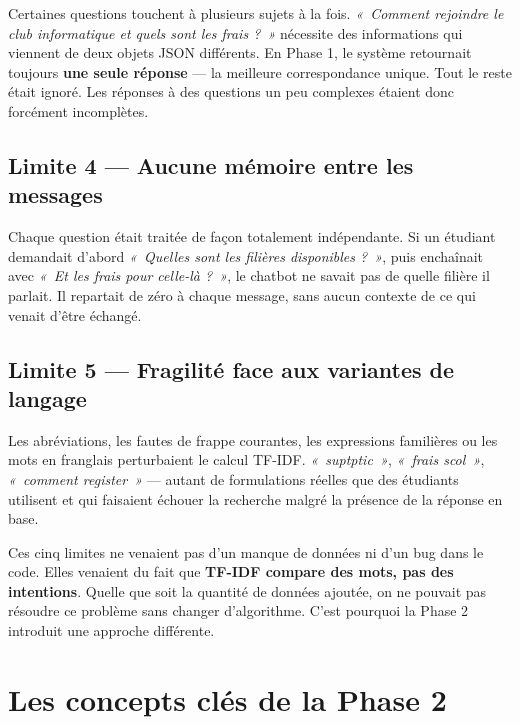 \documentclass[11pt,a4paper]{article}
\begin{document}
Certaines questions touchent à plusieurs sujets à la fois.
\textit{«~Comment rejoindre le club informatique et quels sont
les frais ?~»} nécessite des informations qui viennent de deux
objets JSON différents. En Phase 1, le système retournait
toujours \textbf{une seule réponse} --- la meilleure correspondance
unique. Tout le reste était ignoré. Les réponses à des questions
un peu complexes étaient donc forcément incomplètes.

\subsection{Limite 4 --- Aucune mémoire entre les messages}

Chaque question était traitée de façon totalement indépendante.
Si un étudiant demandait d'abord \textit{«~Quelles sont les filières
disponibles ?~»}, puis enchaînait avec \textit{«~Et les frais pour
celle-là ?~»}, le chatbot ne savait pas de quelle filière il
parlait. Il repartait de zéro à chaque message, sans aucun
contexte de ce qui venait d'être échangé.

\subsection{Limite 5 --- Fragilité face aux variantes de langage}

Les abréviations, les fautes de frappe courantes, les expressions
familières ou les mots en franglais perturbaient le calcul TF-IDF.
\textit{«~suptptic~»}, \textit{«~frais scol~»}, \textit{«~comment
register~»} --- autant de formulations réelles que des étudiants
utilisent et qui faisaient échouer la recherche malgré la
présence de la réponse en base.

\vspace{0.5cm}

\begin{important}
Ces cinq limites ne venaient pas d'un manque de données
ni d'un bug dans le code. Elles venaient du fait que
\textbf{TF-IDF compare des mots, pas des intentions}.
Quelle que soit la quantité de données ajoutée, on ne
pouvait pas résoudre ce problème sans changer d'algorithme.
C'est pourquoi la Phase 2 introduit une approche différente.
\end{important}

\clearpage

\section{Les concepts clés de la Phase 2}
\end{document}
